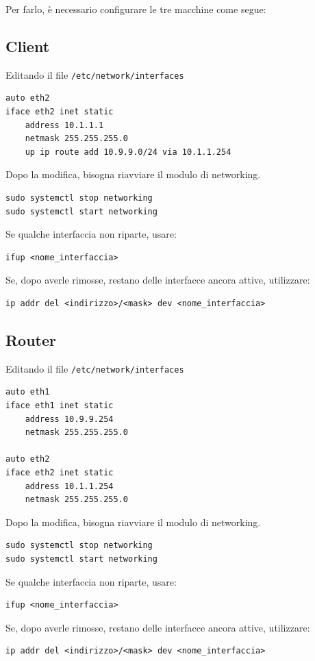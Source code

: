 \documentclass[a4paper]{report}
\newenvironment{ricordati}{\begin{tcolorbox}[fonttitle=\sffamily\bfseries\large,title=Ricordati,colframe=orange!75!white]}{\end{tcolorbox}}
\newenvironment{code}{\begin{tcolorbox}[size=small]}{\end{tcolorbox}}
\begin{document}
Per farlo, è necessario configurare le tre macchine come segue:

\subsection{Client}

Editando il file \texttt{/etc/network/interfaces}

\begin{code}
\begin{lstlisting}
auto eth2
iface eth2 inet static
	address 10.1.1.1
	netmask 255.255.255.0
	up ip route add 10.9.9.0/24 via 10.1.1.254
\end{lstlisting}
\end{code}

\begin{ricordati}
Dopo la modifica, bisogna riavviare il modulo di networking.
\begin{lstlisting}
sudo systemctl stop networking
sudo systemctl start networking
\end{lstlisting}

Se qualche interfaccia non riparte, usare:
\begin{lstlisting}
ifup <nome_interfaccia>
\end{lstlisting}

Se, dopo averle rimosse, restano delle interfacce ancora attive, utilizzare:
\begin{lstlisting}
ip addr del <indirizzo>/<mask> dev <nome_interfaccia>
\end{lstlisting}
\end{ricordati}

\subsection{Router}

Editando il file \texttt{/etc/network/interfaces}

\begin{code}
\begin{lstlisting}
auto eth1
iface eth1 inet static
	address 10.9.9.254
	netmask 255.255.255.0

auto eth2
iface eth2 inet static
	address 10.1.1.254
	netmask 255.255.255.0
\end{lstlisting}
\end{code}

\begin{ricordati}
	Dopo la modifica, bisogna riavviare il modulo di networking.
\begin{lstlisting}
sudo systemctl stop networking
sudo systemctl start networking
\end{lstlisting}

Se qualche interfaccia non riparte, usare:
\begin{lstlisting}
ifup <nome_interfaccia>
\end{lstlisting}

Se, dopo averle rimosse, restano delle interfacce ancora attive, utilizzare:
\begin{lstlisting}
ip addr del <indirizzo>/<mask> dev <nome_interfaccia>
\end{lstlisting}
\end{ricordati}
\end{document}
